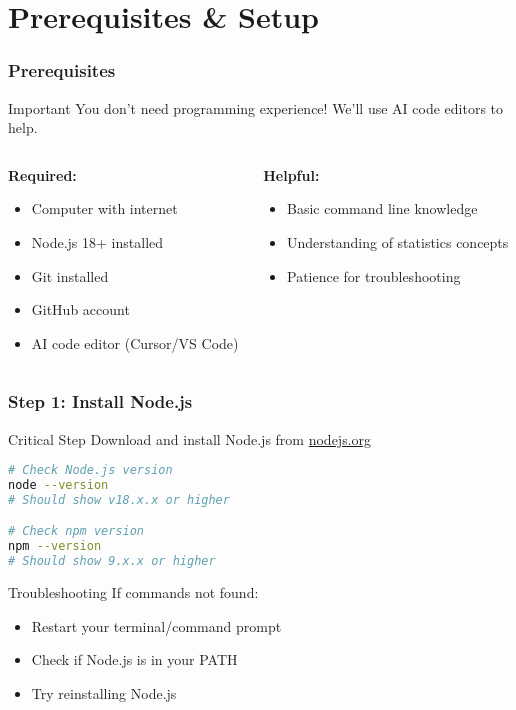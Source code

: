 \documentclass[aspectratio=169]{beamer}
\begin{document}
\section{Prerequisites \& Setup}

\begin{frame}
\frametitle{Prerequisites}
\begin{alertblock}{Important}
You don't need programming experience! We'll use AI code editors to help.
\end{alertblock}

\begin{columns}
\begin{column}{0.5\textwidth}
\textbf{Required:}
\begin{itemize}
\item Computer with internet
\item Node.js 18+ installed
\item Git installed
\item GitHub account
\item AI code editor (Cursor/VS Code)
\end{itemize}
\end{column}
\begin{column}{0.5\textwidth}
\textbf{Helpful:}
\begin{itemize}
\item Basic command line knowledge
\item Understanding of statistics concepts
\item Patience for troubleshooting
\end{itemize}
\end{column}
\end{columns}
\end{frame}

\begin{frame}[fragile]
\frametitle{Step 1: Install Node.js}
\begin{alertblock}{Critical Step}
Download and install Node.js from \href{https://nodejs.org}{nodejs.org}
\end{alertblock}

\begin{lstlisting}[language=bash, caption=Verify Installation]
# Check Node.js version
node --version
# Should show v18.x.x or higher

# Check npm version
npm --version
# Should show 9.x.x or higher
\end{lstlisting}

\begin{exampleblock}{Troubleshooting}
If commands not found:
\begin{itemize}
\item Restart your terminal/command prompt
\item Check if Node.js is in your PATH
\item Try reinstalling Node.js
\end{itemize}
\end{exampleblock}
\end{frame}
\end{document}
